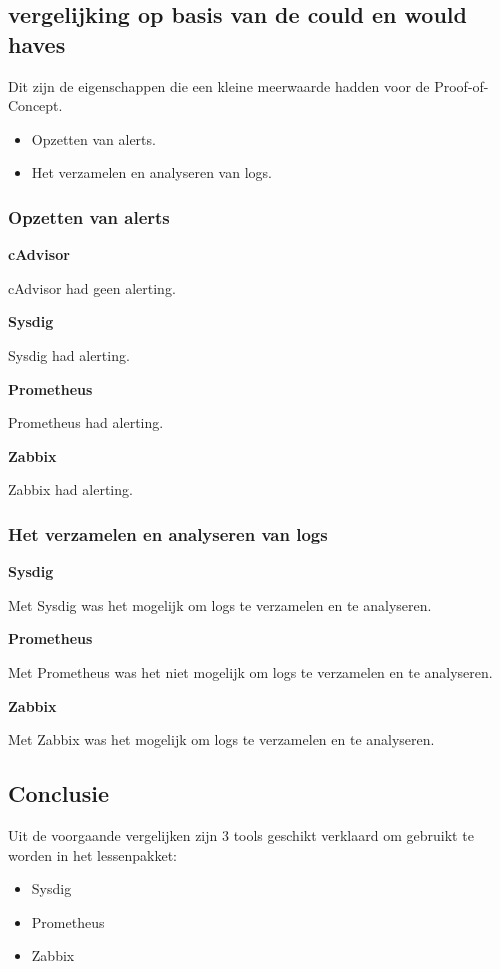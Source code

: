 \subsection{vergelijking op basis van de could en would haves}

Dit zijn de eigenschappen die een kleine meerwaarde hadden voor de Proof-of-Concept.

\begin{itemize}
    \item Opzetten van alerts.
    \item Het verzamelen en analyseren van logs. 
\end{itemize}

\subsubsection{Opzetten van alerts}

\textbf{cAdvisor}

cAdvisor had geen alerting.

\textbf{Sysdig}

Sysdig had alerting.

\textbf{Prometheus}

Prometheus had alerting.

\textbf{Zabbix}

Zabbix had alerting.

\subsubsection{Het verzamelen en analyseren van logs}

\textbf{Sysdig}

Met Sysdig was het mogelijk om logs te verzamelen en te analyseren.

\textbf{Prometheus}

Met Prometheus was het niet mogelijk om logs te verzamelen en te analyseren.

\textbf{Zabbix}

Met Zabbix was het mogelijk om logs te verzamelen en te analyseren.

\subsection{Conclusie}

Uit de voorgaande vergelijken zijn 3 tools geschikt verklaard om gebruikt te worden in het lessenpakket:

\begin{itemize}
    \item Sysdig
    \item Prometheus
    \item Zabbix
\end{itemize}

